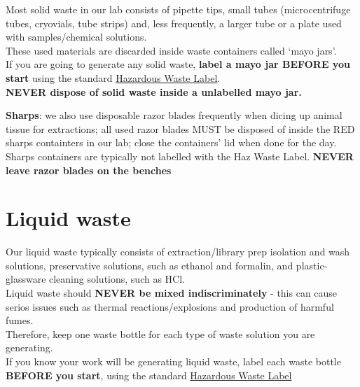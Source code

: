 \documentclass[
  letterpaper,
  DIV=11,
  numbers=noendperiod]{scrreprt}
\begin{document}
Most solid waste in our lab consists of pipette tips, small tubes
(microcentrifuge tubes, cryovials, tube strips) and, less frequently, a
larger tube or a plate used with samples/chemical solutions.\\
These used materials are discarded inside waste containers called `mayo
jars'.\\
If you are going to generate any solid waste, \textbf{label a mayo jar
BEFORE you start} using the standard
\href{https://github.com/DrK-Lo/lotterhoslabprotocols/blob/gh-pages/notebook/Haz\%20Waste\%20labels.pdf}{Hazardous
Waste Label}.\\
\textbf{NEVER dispose of solid waste inside a unlabelled mayo jar.}

\textbf{Sharps}: we also use disposable razor blades frequently when
dicing up animal tissue for extractions; all used razor blades MUST be
disposed of inside the RED sharps containters in our lab; close the
containers' lid when done for the day. Sharps containers are typically
not labelled with the Haz Waste Label. \textbf{NEVER leave razor blades
on the benches}

\hypertarget{liquid-waste}{%
\section*{\texorpdfstring{\textbf{Liquid
waste}}{Liquid waste}}\label{liquid-waste}}

Our liquid waste typically consists of extraction/library prep isolation
and wash solutions, preservative solutions, such as ethanol and
formalin, and plastic-glassware cleaning solutions, such as HCl.\\
Liquid waste should \textbf{NEVER be mixed indiscriminately} - this can
cause serios issues such as thermal reactions/explosions and production
of harmful fumes.\\
Therefore, keep one waste bottle for each type of waste solution you are
generating.\\
If you know your work will be generating liquid waste, label each waste
bottle \textbf{BEFORE you start}, using the standard
\href{https://github.com/DrK-Lo/lotterhoslabprotocols/blob/gh-pages/notebook/Haz\%20Waste\%20labels.pdf}{Hazardous
Waste Label}
\end{document}
